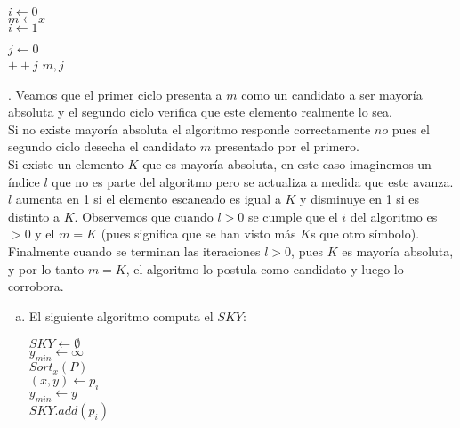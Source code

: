\documentclass[dcc,uchile]{fcfmcourse}
\theoremstyle{plain}
\theoremstyle{definition}
\begin{document}
\begin{problems}
\begin{algorithm}
$i\gets 0$\\
 {
     { 
        $m\gets x$\\
        $i\gets 1$\\        
    } 
}
\end{algorithm}
\begin{algorithm}
$j\gets 0$\\
 {
     {
        $++j$
    }
}
 {
    \Return $m,j$
}
\end{algorithm}
\magic \magic. Veamos que el primer ciclo presenta a $m$ como un candidato a ser mayoría absoluta y el segundo ciclo verifica que este elemento realmente lo sea.\\
Si no existe mayoría absoluta el algoritmo responde correctamente $no$ pues el segundo ciclo desecha el candidato $m$ presentado por el primero.\\
Si existe un elemento $K$ que es mayoría absoluta, en este caso imaginemos un índice $l$ que no es parte del algoritmo pero se actualiza a medida que este avanza.$l$ aumenta en 1 si el elemento escaneado es igual a $K$ y disminuye en 1 si es distinto a $K$. Observemos que cuando $l>0$ se cumple que el $i$ del algoritmo es $>0$ y el $m=K$ (pues significa que se han visto más $K$s que otro símbolo). Finalmente cuando se terminan las iteraciones $l>0$, pues $K$ es mayoría absoluta, y por lo tanto $m=K$, el algoritmo lo postula como candidato y luego lo corrobora.
\\
\begin{enumerate}[a)]
    \item El siguiente algoritmo computa el $SKY$:\\
    \begin{algorithm}[h!]
    $SKY \gets \emptyset$\\
     $y_{min} \gets \infty$\\
    $Sort_{x}(P)$\\
     {
        $(x,y) \gets p_{i}$\\
         {
            $y_{min} \gets y$\\
            $SKY.add(p_{i})$\\
        }
    }
    \end{algorithm}
    

\end{enumerate}
\end{problems}
\end{document}
